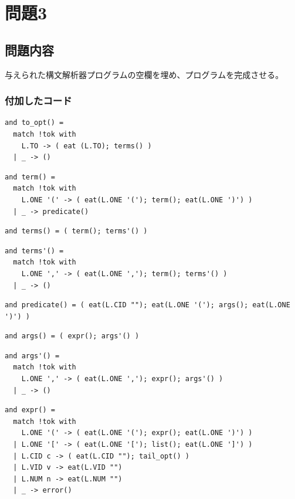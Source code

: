 \documentclass{ltjsarticle}
\begin{document}
\section{問題3}
\subsection{問題内容}
与えられた構文解析器プログラムの空欄を埋め、プログラムを完成させる。
\subsubsection{付加したコード}
\begin{lstlisting}[caption = to\_opt]
and to_opt() =
  match !tok with
    L.TO -> ( eat (L.TO); terms() )
  | _ -> ()
\end{lstlisting}

\begin{lstlisting}[caption = term]
and term() =
  match !tok with
    L.ONE '(' -> ( eat(L.ONE '('); term(); eat(L.ONE ')') )
  | _ -> predicate()
\end{lstlisting}

\begin{lstlisting}[caption = terms]
and terms() = ( term(); terms'() )
\end{lstlisting}

\begin{lstlisting}[caption = terms']
and terms'() =
  match !tok with
    L.ONE ',' -> ( eat(L.ONE ','); term(); terms'() )
  | _ -> ()
\end{lstlisting}

\begin{lstlisting}[caption = predicate]
and predicate() = ( eat(L.CID ""); eat(L.ONE '('); args(); eat(L.ONE ')') )
\end{lstlisting}

\begin{lstlisting}[caption = args]
and args() = ( expr(); args'() )
\end{lstlisting}

\begin{lstlisting}[caption = args']
and args'() = 
  match !tok with
    L.ONE ',' -> ( eat(L.ONE ','); expr(); args'() )
  | _ -> ()
\end{lstlisting}

\begin{lstlisting}[caption = expr]
and expr() =
  match !tok with
    L.ONE '(' -> ( eat(L.ONE '('); expr(); eat(L.ONE ')') )
  | L.ONE '[' -> ( eat(L.ONE '['); list(); eat(L.ONE ']') )
  | L.CID c -> ( eat(L.CID ""); tail_opt() )
  | L.VID v -> eat(L.VID "")
  | L.NUM n -> eat(L.NUM "")
  | _ -> error()
\end{lstlisting}
\end{document}
